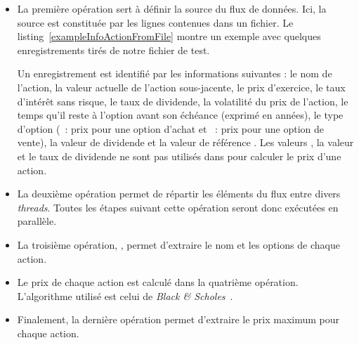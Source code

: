 \begin{itemize}

\item La premi\`ere op\'eration sert \`a d\'efinir la source du flux de donn\'ees. Ici, la source est constitu\'ee par les lignes contenues dans un fichier. Le listing~\ref{exampleInfoActionFromFile} montre un exemple avec quelques enregistrements tir\'es de notre fichier de test. 

Un enregistrement est identifi\'e par les informations suivantes : le nom de l'action, la valeur actuelle de l'action sous-jacente, le prix d'exercice, le taux d'int\'er\^et sans risque, le taux de dividende, la volatilit\'e du prix de l'action, le temps qu'il reste \`a l'option avant son \'ech\'eance (exprim\'e en ann\'ees), le type d'option (~: prix pour une option d'achat et ~: prix pour une option de vente), la valeur de dividende et la valeur de r\'ef\'erence . 
Les valeurs , la valeur et le taux de dividende ne sont pas utilis\'es dans  pour calculer le prix d'une action.

\item La deuxi\`eme op\'eration permet de r\'epartir les \'el\'ements du flux entre divers \emph{threads}.
Toutes les \'etapes suivant cette op\'eration seront donc ex\'ecut\'ees en parall\`ele.

\item La troisi\`eme op\'eration,  , permet d'extraire le nom et les options de chaque action.



\item  Le prix de chaque action est calcul\'e dans la quatri\`eme op\'eration. L'algorithme utilis\'e est celui de \emph{Black \& Scholes}~\citep{macbeth1979empirical}. 

\item Finalement, la derni\`ere op\'eration permet d'extraire le prix maximum pour chaque action.


\end{itemize}

